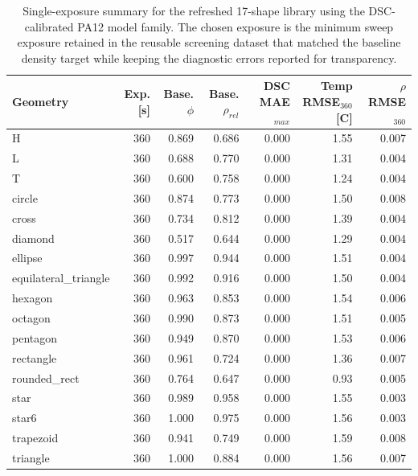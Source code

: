 \begin{table}[tb]
\centering
\caption{Single-exposure summary for the refreshed 17-shape library using the DSC-calibrated PA12 model family. The chosen exposure is the minimum sweep exposure retained in the reusable screening dataset that matched the baseline density target while keeping the diagnostic errors reported for transparency.}
\label{tab:single_library_refresh}
\small
\begin{tabular}{lrrrrrr}
\toprule
Geometry & Exp. [s] & Base. $\phi$ & Base. $\rho_{rel}$ & DSC MAE$_{max}$ & Temp RMSE$_{360}$ [C] & $\rho$ RMSE$_{360}$ \\
\midrule
H & 360 & 0.869 & 0.686 & 0.000 & 1.55 & 0.007 \\
L & 360 & 0.688 & 0.770 & 0.000 & 1.31 & 0.004 \\
T & 360 & 0.600 & 0.758 & 0.000 & 1.24 & 0.004 \\
circle & 360 & 0.874 & 0.773 & 0.000 & 1.50 & 0.008 \\
cross & 360 & 0.734 & 0.812 & 0.000 & 1.39 & 0.004 \\
diamond & 360 & 0.517 & 0.644 & 0.000 & 1.29 & 0.004 \\
ellipse & 360 & 0.997 & 0.944 & 0.000 & 1.51 & 0.004 \\
equilateral_triangle & 360 & 0.992 & 0.916 & 0.000 & 1.50 & 0.004 \\
hexagon & 360 & 0.963 & 0.853 & 0.000 & 1.54 & 0.006 \\
octagon & 360 & 0.990 & 0.873 & 0.000 & 1.51 & 0.005 \\
pentagon & 360 & 0.949 & 0.870 & 0.000 & 1.53 & 0.006 \\
rectangle & 360 & 0.961 & 0.724 & 0.000 & 1.36 & 0.007 \\
rounded_rect & 360 & 0.764 & 0.647 & 0.000 & 0.93 & 0.005 \\
star & 360 & 0.989 & 0.958 & 0.000 & 1.55 & 0.003 \\
star6 & 360 & 1.000 & 0.975 & 0.000 & 1.56 & 0.003 \\
trapezoid & 360 & 0.941 & 0.749 & 0.000 & 1.59 & 0.008 \\
triangle & 360 & 1.000 & 0.884 & 0.000 & 1.56 & 0.007 \\
\bottomrule
\end{tabular}
\end{table}